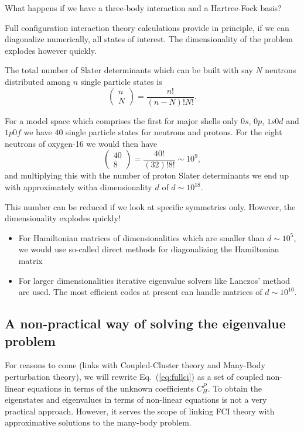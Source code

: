 \noindent
What happens if we have a three-body interaction and a Hartree-Fock basis? 

Full configuration interaction theory calculations provide in principle, if we can diagonalize numerically, all states of interest. The dimensionality of the problem explodes however quickly.

The total number of Slater determinants which can be built with say $N$ neutrons distributed among $n$ single particle states is
\[
\left (\begin{array}{c} n \\ N\end{array} \right) =\frac{n!}{(n-N)!N!}. 
\]

For a model space which comprises the first for major shells only $0s$, $0p$, $1s0d$ and $1p0f$ we have $40$ single particle states for neutrons and protons.  For the eight neutrons of oxygen-16 we would then have
\[
\left (\begin{array}{c} 40 \\ 8\end{array} \right) =\frac{40!}{(32)!8!}\sim 10^{9}, 
\]
and multiplying this with the number of proton Slater determinants we end up with approximately witha dimensionality $d$ of $d\sim 10^{18}$.


This number can be reduced if we look at specific symmetries only. However, the dimensionality explodes quickly!

\begin{itemize}
\item For Hamiltonian matrices of dimensionalities  which are smaller than $d\sim 10^5$, we would use so-called direct methods for diagonalizing the Hamiltonian matrix

\item For larger dimensionalities iterative eigenvalue solvers like Lanczos' method are used. The most efficient codes at present can handle matrices of $d\sim 10^{10}$. 
\end{itemize}

\noindent
\subsection{A non-practical way of solving the eigenvalue problem}

For reasons to come (links with Coupled-Cluster theory and Many-Body perturbation theory), 
we will rewrite Eq.~(\ref{eq:fullci}) as a set of coupled non-linear equations in terms of the unknown coefficients $C_H^P$. 
To obtain the eigenstates and eigenvalues in terms of non-linear equations is not a very practical approach. However, it serves the scope of linking FCI theory with approximative solutions to the many-body problem.


